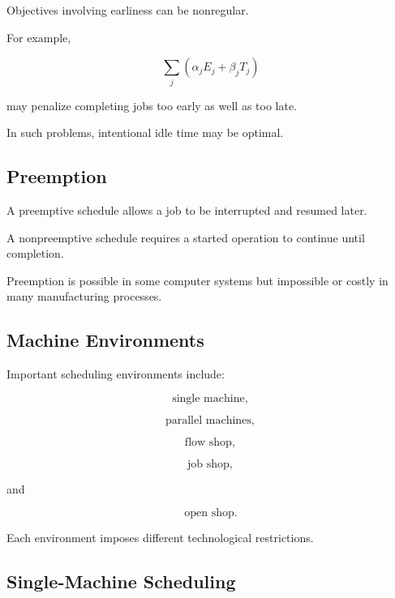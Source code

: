 Objectives involving earliness can be nonregular.

For example,

\[
\boxed{
\sum_j
(
\alpha_jE_j+\beta_jT_j
)
}
\]

may penalize completing jobs too early as well as too late.

In such problems, intentional idle time may be optimal.

\subsection{Preemption}
\label{subsec:scheduling-preemption}

A preemptive schedule allows a job to be interrupted and resumed later.

A nonpreemptive schedule requires a started operation to continue until
completion.

Preemption is possible in some computer systems but impossible or costly
in many manufacturing processes.

\subsection{Machine Environments}
\label{subsec:scheduling-machine-environments}

Important scheduling environments include:

\[
\boxed{
\text{single machine},
}
\]

\[
\boxed{
\text{parallel machines},
}
\]

\[
\boxed{
\text{flow shop},
}
\]

\[
\boxed{
\text{job shop},
}
\]

and

\[
\boxed{
\text{open shop}.
}
\]

Each environment imposes different technological restrictions.

\subsection{Single-Machine Scheduling}
\label{subsec:single-machine-scheduling}

